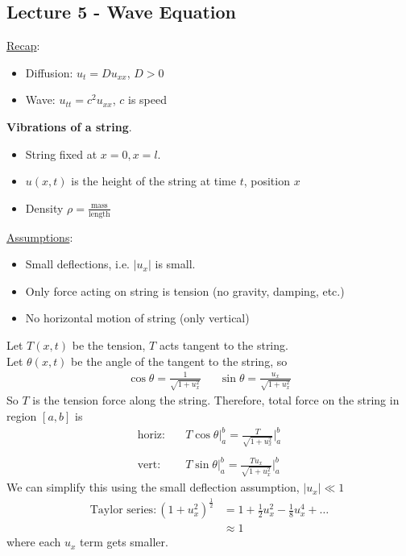 \documentclass[12pt, letterpaper]{article}
\begin{document}
\subsection{Lecture 5 - Wave Equation}
\underline{Recap}:
\begin{itemize}
    \item Diffusion: $u_t = Du_{xx}$, $D > 0$
    \item Wave: $u_{tt} = c^2u_{xx}$, $c$ is speed 
\end{itemize}
\textbf{Vibrations of a string}.
\begin{itemize}
    \item String fixed at $x=0, x=l$.
    \item $u(x,t)$ is the height of the string at time $t$, position $x$
    \item Density $\rho = \frac{\text{mass}}{\text{length}}$
\end{itemize}
\underline{Assumptions}:
\begin{itemize}
    \item Small deflections, i.e. $|u_x|$ is small.
    \item Only force acting on string is tension (no gravity, damping, etc.)
    \item No horizontal motion of string (only vertical)
\end{itemize}
Let $T(x,t)$ be the tension, $T$ acts tangent to the string. \\
Let $\theta(x,t)$ be the angle of the tangent to the string, so
\begin{align*}
    \cos \theta = \frac{1}{\sqrt{1+u_x^2}}  && \sin \theta = \frac{u_x}{\sqrt{1+u_x^2}}
\end{align*}
So $T$ is the tension force along the string. Therefore, total force on the string 
in region $[a,b]$ is
\begin{align*}
    \text{horiz:}\quad &T\cos\theta\big\vert^b_a = \frac{T}{\sqrt{1+u_x^2}}\Big\vert^b_a \\ \\
    \text{vert:}\quad &T\sin\theta\big\vert^b_a = \frac{Tu_x}{\sqrt{1+u_x^2}}\Big\vert^b_a
\end{align*}
We can simplify this using the small deflection assumption, $|u_x| \ll 1$ 
\begin{align*}
    \text{Taylor series}: (1+u^2_x)^\frac 12 &= 1 + \frac 12 u_x^2 - \frac 18 u _x^4 + \dots\\
    &\approx 1
\end{align*}
where each $u_x$ term gets smaller. \\ \\
\end{document}
